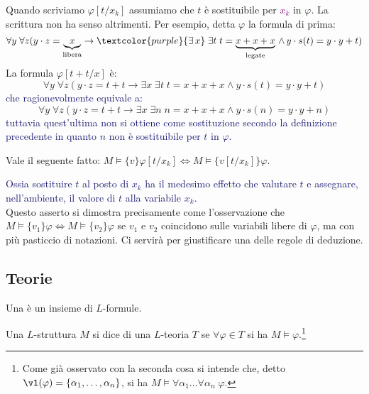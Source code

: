 \begin{note}
    Quando scriviamo $\varphi[t/x_k]$ assumiamo che $t$ è sostituibile per \textcolor{purple}{$x_k$} in $\varphi$. La scrittura non ha senso altrimenti.
    Per esempio, detta $\varphi$ la formula di prima:
    \[ \forall y \; \forall z (y\cdot z = \underbrace{x}_{\text{libera}} \to \textcolor{purple}{\exists\, x} \; \exists t \; t = \underbrace{x + x + x}_{\text{legate}}\, \land \,y\cdot s(t) = y \cdot y + t)
    \]
    La formula $\varphi[t+t/x]$ è:
    \[ \forall y \; \forall z (y\cdot z = t+t \to \exists x \; \exists t \; t = x + x + x \land y\cdot s(t) = y \cdot y + t)
    \]
    \textcolor{MidnightBlue}{che ragionevolmente equivale a:}
    \[ \forall y \; \forall z (y\cdot z = t+t \to \exists x \; \exists n \; n = x + x + x \land y\cdot s(n) = y \cdot y + n)
    \]
    \textcolor{MidnightBlue}{tuttavia quest'ultima non si ottiene come sostituzione secondo la definizione precedente in quanto $n$ non è sostituibile per $t$ in $\varphi$.}
\end{note}

\begin{exercise}
    Vale il seguente fatto: $M \models\{v\} \varphi[t/x_k] \iff M \models\{v[t/x_k]\} \varphi$.
\end{exercise}

\textcolor{MidnightBlue}{Ossia sostituire $t$ al posto di $x_k$  ha il medesimo effetto che valutare $t$ e assegnare, nell'ambiente, il valore di $t$ alla variabile $x_k$.}\\
Questo asserto si dimostra precisamente come l'osservazione che $M \models\{v_1\} \varphi \iff M \models\{v_2\} \varphi$ se $v_1$ e $v_2$ coincidono sulle variabili libere di $\varphi$, ma 
con più pasticcio di notazioni. Ci servirà per giustificare una delle regole di deduzione.

\subsection{Teorie}

\begin{definition}[$L$-teoria]
    Una  è un insieme di $L$-formule.
\end{definition}

\begin{definition}[Modello]
    Una $L$-struttura $M$ si dice  di una $L$-teoria $T$ se $\forall \varphi \in T$ si ha $M \models \varphi$.\footnote{Come già osservato con la seconda cosa si intende che, detto $\vl(\varphi) = \{\alpha_1,\ldots,\alpha_n\}$, si ha $M \models \forall \alpha_1 \ldots \forall \alpha_n \; \varphi$.}
\end{definition}

